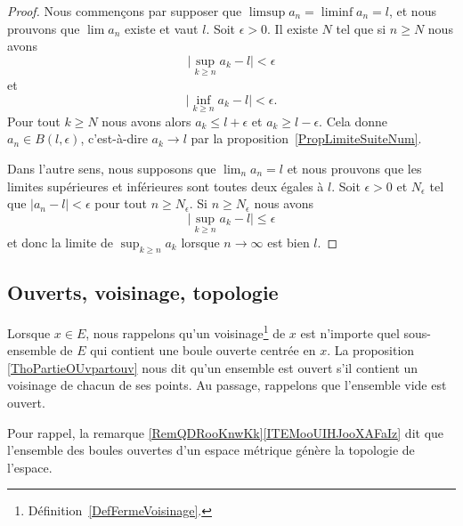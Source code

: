 \begin{proof}
    Nous commençons par supposer que \( \limsup a_n=\liminf a_n=l\), et nous prouvons que \( \lim a_n\) existe et vaut \( l\). Soit \( \epsilon>0\). Il existe \( N\) tel que si \( n\geq N\) nous avons
    \begin{equation}
        \big| \sup_{k\geq n}a_k-l \big|<\epsilon
    \end{equation}
    et
    \begin{equation}
        \big| \inf_{k\geq n}a_k-l \big|<\epsilon.
    \end{equation}
    Pour tout \( k\geq N\) nous avons alors \( a_k\leq l+\epsilon\) et \( a_k\geq l-\epsilon\). Cela donne \( a_n\in B(l,\epsilon)\), c'est-à-dire \( a_k\to l\) par la proposition~\ref{PropLimiteSuiteNum}.

    Dans l'autre sens, nous supposons que \( \lim_n a_n=l\) et nous prouvons que les limites supérieures et inférieures sont toutes deux égales à \( l\). Soit \( \epsilon>0\) et \( N_{\epsilon}\) tel que \( | a_n-l |<\epsilon\) pour tout \( n\geq N_{\epsilon}\). Si \( n\geq N_{\epsilon}\) nous avons
    \begin{equation}
        \big| \sup_{k\geq n}a_k-l \big|\leq \epsilon
    \end{equation}
    et donc la limite de \( \sup_{k\geq n}a_k\) lorsque \( n\to \infty\) est bien \(l\).
\end{proof}

\subsection{Ouverts, voisinage, topologie}

Lorsque $x\in E$, nous rappelons qu'un voisinage\footnote{Définition~\ref{DefFermeVoisinage}.} de $x$ est n'importe quel sous-ensemble de $E$ qui contient une boule ouverte centrée en $x$. La proposition \ref{ThoPartieOUvpartouv} nous dit qu'un ensemble est ouvert s'il contient un voisinage de chacun de ses points. Au passage, rappelons que l'ensemble vide est ouvert.

Pour rappel, la remarque \ref{RemQDRooKnwKk}\ref{ITEMooUIHJooXAFaIz} dit que l'ensemble des boules ouvertes d'un espace métrique génère la topologie de l'espace.

